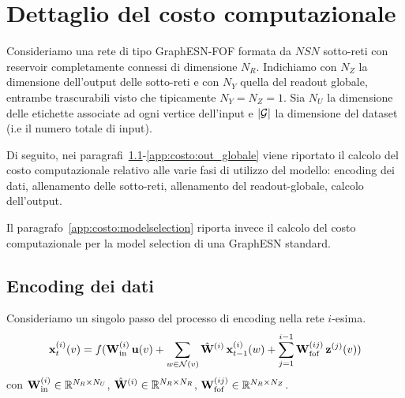 \chapter{Dettaglio del costo computazionale}\label{app:costo}
\newcommand{\NSN}{\mathit{NSN}}
\newcommand{\MAXV}{\mathit{MAXV}}
\newcommand{\MAXIT}{\mathit{MAXIT}}
\newcommand{\Nr}{\ensuremath{N_R}}
\newcommand{\Ny}{\ensuremath{N_Y}}
\newcommand{\Nz}{\ensuremath{N_Z}}
\newcommand{\Nu}{\ensuremath{N_U}}
\newcommand{\Nf}{\ensuremath{N_F}}
\newcommand{\G}{\ensuremath{\abs{\mathcal{G}}}}
Consideriamo una rete di tipo GraphESN-FOF formata da $\NSN$ sotto-reti con reservoir completamente connessi di dimensione $\Nr$.
Indichiamo con $\Nz$ la dimensione dell'output delle sotto-reti e con $\Ny$ quella del readout globale, entrambe trascurabili visto che tipicamente $\Ny = \Nz = 1$. Sia $\Nu$ la dimensione delle etichette associate ad ogni vertice dell'input e $\G$ la dimensione del dataset (i.e il numero totale di input). 

Di seguito, nei paragrafi~\ref{app:costo:encoding}-\ref{app:costo:out_globale} viene riportato il calcolo del costo computazionale relativo alle varie fasi di utilizzo del modello: encoding dei dati, allenamento delle sotto-reti, allenamento del readout-globale, calcolo dell'output.

Il paragrafo~\ref{app:costo:modelselection} riporta invece il calcolo del costo computazionale per la model selection di una GraphESN standard.


\section{Encoding dei dati}\label{app:costo:encoding}
Consideriamo un singolo passo del processo di encoding nella rete $i$-esima. 
\begin{equation}
	\vect{x}^{(i)}_t(v) = f( 
	\matr{W}^{(i)}_\textup{in} \, \vect{u}(v) + 
	\sum_{w \in \mathcal{N}(v)} \hat{\matr{W}}^{(i)} \, \vect{x}^{(i)}_{t-1}(w) +
	\sum_{j=1}^{i-1} \matr{W}^{(ij)}_\textup{fof} \, \vect{z}^{(j)}(v)
	)
\end{equation}
con $\matr{W}^{(i)}_\textup{in} \in \R^{\Nr \times \Nu}$, $\hat{\matr{W}}^{(i)} \in \R^{\Nr \times \Nr}$, $\matr{W}^{(ij)}_\textup{fof} \in \R^{\Nr \times \Nz}$.


